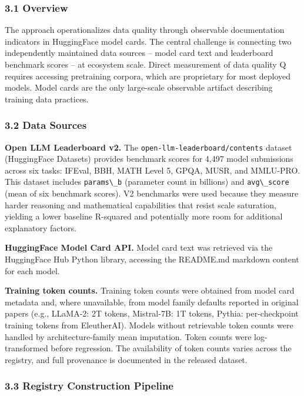 
\subsubsection{3.1 Overview}

The approach operationalizes data quality through observable documentation indicators in HuggingFace model cards. The central challenge is connecting two independently maintained data sources -- model card text and leaderboard benchmark scores -- at ecosystem scale. Direct measurement of data quality Q requires accessing pretraining corpora, which are proprietary for most deployed models. Model cards are the only large-scale observable artifact describing training data practices.

\subsubsection{3.2 Data Sources}

\textbf{Open LLM Leaderboard v2.} The \texttt{open-llm-leaderboard/contents} dataset (HuggingFace Datasets) provides benchmark scores for 4,497 model submissions across six tasks: IFEval, BBH, MATH Level 5, GPQA, MUSR, and MMLU-PRO. This dataset includes \texttt{params\textbackslash \_b} (parameter count in billions) and \texttt{avg\textbackslash \_score} (mean of six benchmark scores). V2 benchmarks were used because they measure harder reasoning and mathematical capabilities that resist scale saturation, yielding a lower baseline R-squared and potentially more room for additional explanatory factors.

\textbf{HuggingFace Model Card API.} Model card text was retrieved via the HuggingFace Hub Python library, accessing the README.md markdown content for each model.

\textbf{Training token counts.} Training token counts were obtained from model card metadata and, where unavailable, from model family defaults reported in original papers (e.g., LLaMA-2: 2T tokens, Mistral-7B: 1T tokens, Pythia: per-checkpoint training tokens from EleutherAI). Models without retrievable token counts were handled by architecture-family mean imputation. Token counts were log-transformed before regression. The availability of token counts varies across the registry, and full provenance is documented in the released dataset.

\subsubsection{3.3 Registry Construction Pipeline}

